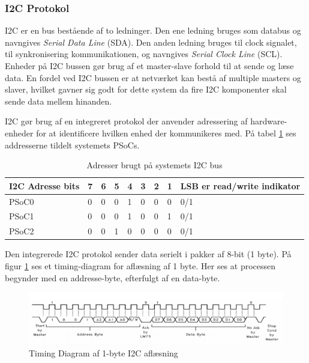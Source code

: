 \subsubsection{I2C Protokol}
\label{afsnit:I2CProtokol}

I2C\cite{I2C} er en bus bestående af to ledninger. Den ene ledning bruges som databus og navngives \textit{Serial Data Line} (SDA). Den anden ledning bruges til clock signalet, til synkronisering kommunikationen, og navngives \textit{Serial Clock Line} (SCL). Enheder på I2C bussen gør brug af et master-slave forhold til at sende og læse data. En fordel ved I2C bussen er at netværket kan bestå af multiple masters og slaver, hvilket gavner sig godt for dette system da fire I2C komponenter skal sende data mellem hinanden.

I2C gør brug af en integreret protokol der anvender adressering af hardware-enheder for at identificere hvilken enhed der kommunikeres med. På tabel \ref{table:I2CAdress} ses addresserne tildelt systemets PSoCs.

\begin{table}[H]
	\centering
	\begin{tabular}{l|lllllll|l}
		\hline
		I2C Adresse bits & 7 & 6 & 5 & 4 & 3 & 2 & 1 & LSB er read/write indikator \\ \hline
		PSoC0        & 0 & 0 & 0 & 1 & 0 & 0 & 0 & 0/1                        \\
		PSoC1        & 0 & 0 & 0 & 1 & 0 & 0 & 1 & 0/1                        \\
		PSoC2        & 0 & 0 & 1 & 0 & 0 & 0 & 0 & 0/1                        \\ \hline
	\end{tabular}
	\caption{Adresser brugt på systemets I2C bus}
	\label{table:I2CAdress}
\end{table}

Den integrerede I2C protokol sender data serielt i pakker af 8-bit (1 byte). På figur \ref{fig:I2CTimingDiagram} ses et timing-diagram for aflæsning af 1 byte. Her ses at processen  begynder med en addresse-byte, efterfulgt af en data-byte. 

\begin{figure}[H]
	\centering
	\includegraphics[width=\textwidth] {Systemarkitektur/images/I2CTimingDiagram}
	\caption{Timing Diagram af 1-byte I2C aflæsning}
	\label{fig:I2CTimingDiagram}
\end{figure}

